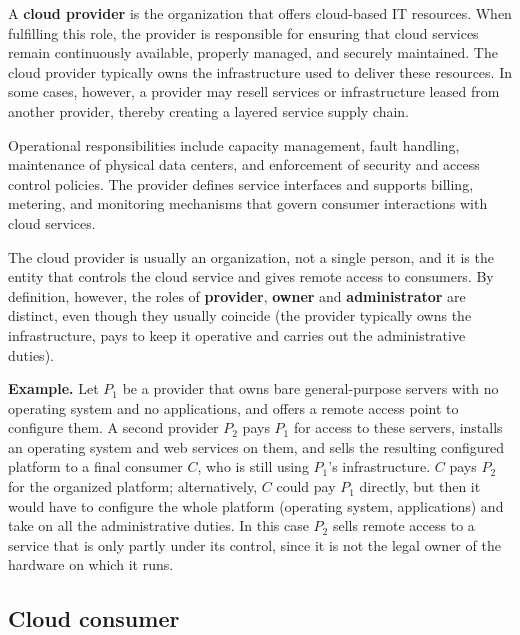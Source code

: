 A \textbf{cloud provider} is the organization that offers cloud-based IT resources. When fulfilling this role, the provider is responsible for ensuring that cloud services remain continuously available, properly managed, and securely maintained. The cloud provider typically owns the infrastructure used to deliver these resources. In some cases, however, a provider may resell services or infrastructure leased from another provider, thereby creating a layered service supply chain.

Operational responsibilities include capacity management, fault handling, maintenance of physical data centers, and enforcement of security and access control policies. The provider defines service interfaces and supports billing, metering, and monitoring mechanisms that govern consumer interactions with cloud services.

The cloud provider is usually an organization, not a single person, and it is the entity that controls the cloud service and gives remote access to consumers. By definition, however, the roles of \textbf{provider}, \textbf{owner} and \textbf{administrator} are distinct, even though they usually coincide (the provider typically owns the infrastructure, pays to keep it operative and carries out the administrative duties).

\textbf{Example.} Let $P_1$ be a provider that owns bare general-purpose servers with no operating system and no applications, and offers a remote access point to configure them. A second provider $P_2$ pays $P_1$ for access to these servers, installs an operating system and web services on them, and sells the resulting configured platform to a final consumer $C$, who is still using $P_1$'s infrastructure. $C$ pays $P_2$ for the organized platform; alternatively, $C$ could pay $P_1$ directly, but then it would have to configure the whole platform (operating system, applications) and take on all the administrative duties. In this case $P_2$ sells remote access to a service that is only partly under its control, since it is not the legal owner of the hardware on which it runs.

\begin{center}
\end{center}

\subsection{Cloud consumer}


